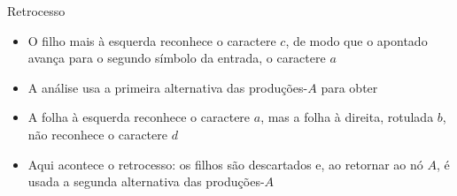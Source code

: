 \begin{frame}[fragile]{Retrocesso}

    \begin{itemize}
        \item O filho mais à esquerda reconhece o caractere $c$, de modo que o apontado avança para o segundo símbolo da entrada, o caractere $a$

        \item A análise usa a primeira alternativa das produções-$A$ para obter
        \begin{center}
        \end{center}

        \item A folha à esquerda reconhece o caractere $a$, mas a folha à direita, rotulada $b$, não reconhece o caractere $d$

        \item Aqui acontece o retrocesso: os filhos são descartados e, ao retornar ao nó $A$, é usada a segunda alternativa das produções-$A$ 
    \end{itemize}

\end{frame}

